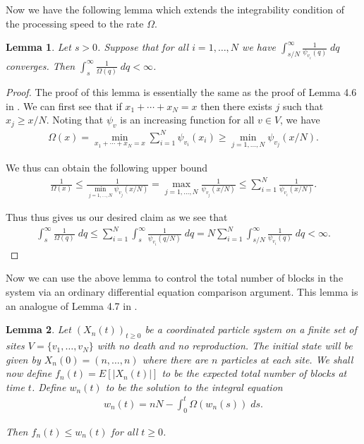 \documentclass[11pt]{article}
\newtheorem{lemma}{Lemma}
\theoremstyle{definition}
\begin{document}
\noindent Now we have the following lemma which extends the integrability condition of the processing speed to the rate $\Omega$.

\begin{lemma}\label{L:upperboundminrate}
    Let $s>0$. Suppose that for all $i = 1, \ldots, N$ we have $\int_{s/N}^\infty \frac{1}{\psi_{v_i}(q)}\;dq$ converges. Then $\int_{s}^\infty \frac{1}{\Omega(q)}\;dq < \infty$.
\end{lemma}

\begin{proof}
    The proof of this lemma is essentially the same as the proof of Lemma 4.6 in \cite{Johnston2023}. We can first see that if $x_1 + \cdots + x_N = x$ then there exists $j$ such that $x_j \geq x/N$. Noting that $\psi_v$ is an increasing function for all $v \in V$, we have 
    \begin{align*}
        \Omega(x) = \min_{x_1 + \cdots + x_N = x} \sum_{i = 1}^N \psi_{v_i}(x_i) \geq \min_{j = 1, \ldots, N} \psi_{v_j}(x/N).
    \end{align*}

    \noindent We thus can obtain the following upper bound
    \begin{align*}
        \frac{1}{\Omega(x)} \leq \frac{1}{\min_{j = 1, \ldots, N} \psi_{v_j}(x/N)} = \max_{j = 1,\ldots, N} \frac{1}{\psi_{v_j}(x/N)}\leq \sum_{i = 1}^N \frac{1}{\psi_{v_i}(x/N)}.
    \end{align*}

    \noindent Thus thus gives us our desired claim as we see that
    \begin{align*}
        \int_{s}^\infty \frac{1}{\Omega(q)}\;dq \leq \sum_{i = 1}^N \int_{s}^\infty \frac{1}{\psi_{v_i}(q/N)}\;dq = N\sum_{i = 1}^N \int_{s/N}^\infty \frac{1}{\psi_{v_i}(q)}\;dq < \infty.
    \end{align*}
\end{proof}

\noindent Now we can use the above lemma to control the total number of blocks in the system via an ordinary differential equation comparison argument. This lemma is an analogue of Lemma 4.7 in \cite{Johnston2023}.

\begin{lemma}\label{L:odecomp}
    Let $(X_n(t))_{t \geq 0}$ be a coordinated particle system on a finite set of sites $V = \{v_1, \ldots, v_N\}$ with no death and no reproduction. The initial state will be given by $X_n(0) = (n, \ldots, n)$ where there are $n$ particles at each site. We shall now define $f_n(t) = E[|X_n(t)|]$ to be the expected total number of blocks at time $t$. Define $w_n(t)$ to be the solution to the integral equation 
    \begin{align*}
        w_n(t) = nN - \int_0^t \Omega(w_n(s))\;ds.
    \end{align*}

    \noindent Then $f_n(t) \leq w_n(t)$ for all $t \geq 0$.
\end{lemma}
\end{document}
